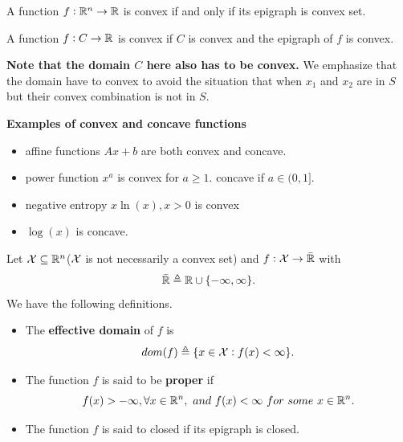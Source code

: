 \begin{refsection}
\begin{definition}
A function $f:\mathbb{R}^n \rightarrow \mathbb{R}$ is convex if and only if its epigraph is convex set.
\end{definition}

\begin{definition}
	\cite[784]{bertsekas2016nonlinear}A function $f: C\to \mathbb{R}$ is convex if $C$ is convex and the epigraph of $f$ is convex.
\end{definition}




\begin{note}
	\textbf{Note that the domain $C$ here also has to be convex.} We emphasize that the domain have to convex to avoid the situation that when $x_1$ and $x_2$ are in $S$ but their convex combination is not in $S$. 

\end{note}





\begin{example}
	\textbf{Examples of convex and concave functions}
	\begin{itemize}
		\item affine functions $Ax+b$ are both convex and concave.
		\item power function $x^a$ is convex for $a \geq 1$. concave if $a\in (0,1]$.
		\item negative entropy $x\ln(x),x>0$ is convex
		\item $\log(x)$ is concave.
	\end{itemize}
\end{example}





\begin{definition}\cite[8]{bertsekas2009convex}
Let $\mathcal{X} \subseteq \mathbb{R}^n$($\mathcal{X}$ is not necessarily a convex set) and $f:\mathcal{X}\to \bar{\mathbb{R}}$ with
$$\bar{\mathbb{R}} \triangleq \mathbb{R}\cup \{-\infty,\infty\}.$$
We have the following definitions.
\begin{itemize}
	\item The \textbf{effective domain} of $f$ is
	$$dom(f) \triangleq \{x\in\mathcal{X}: f(x) < \infty\}.$$
	\item The function $f$ is said to be \textbf{proper} if 
	$$f(x)>-\infty, \forall x\in \mathbb{R}^n, ~and~ f(x) < \infty ~for~some~ x\in\mathbb{R}^n .$$ 
	\item The function $f$ is said to closed if its epigraph is closed.
\end{itemize}
\end{definition}


\end{refsection}
